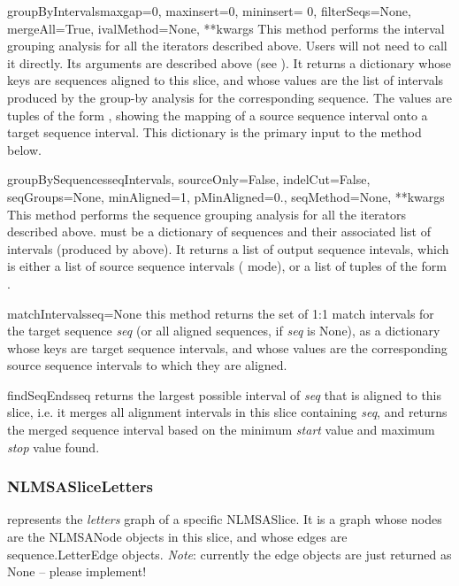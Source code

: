 \documentclass{howto}
\begin{document}
\begin{funcdesc}{groupByIntervals}{maxgap=0, maxinsert=0, mininsert= 0, filterSeqs=None, mergeAll=True, ivalMethod=None, **kwargs}
  This method performs the interval grouping analysis for all the iterators
  described above.  Users will not need to call it directly.  Its arguments
  are described above (see ).  It returns a dictionary
  whose keys are sequences aligned to this slice, and whose values are
  the list of intervals produced by the group-by analysis for the corresponding
  sequence.  The values are tuples of the form
  , showing the
  mapping of a source sequence interval onto a target sequence interval.
  This dictionary is the primary input to the 
  method below.
\end{funcdesc}

\begin{funcdesc}{groupBySequences}{seqIntervals, sourceOnly=False, indelCut=False, seqGroups=None, minAligned=1, pMinAligned=0., seqMethod=None, **kwargs}
  This method performs the sequence grouping analysis for all the iterators
  described above.   must be a dictionary of sequences
  and their associated list of intervals (produced by 
  above).  It returns a list of output sequence intevals, which is either
  a list of source sequence intervals ( mode), or a list
  of tuples of the form .
\end{funcdesc}


\begin{funcdesc}{matchIntervals}{seq=None}
  this method returns the set of
  1:1 match intervals for the target sequence {\em seq} (or all
  aligned sequences, if {\em seq} is None), as a dictionary
  whose keys are target sequence intervals, and whose values are
  the corresponding source sequence intervals to which they are
  aligned.
\end{funcdesc}

\begin{funcdesc}{findSeqEnds}{seq}
  returns the largest possible interval of
  {\em seq} that is aligned to this slice, i.e. it merges all 
  alignment intervals in this slice containing {\em seq}, and
  returns the merged sequence interval based on the minimum {\em start}
  value and maximum {\em stop} value found.
\end{funcdesc}

\subsubsection{NLMSASliceLetters}
represents the {\em letters} graph of a specific NLMSASlice.  It is
a graph whose nodes are the NLMSANode objects in this slice, and whose
edges are sequence.LetterEdge objects. {\em Note}: currently the edge objects
are just returned as None -- please implement!
\end{document}
